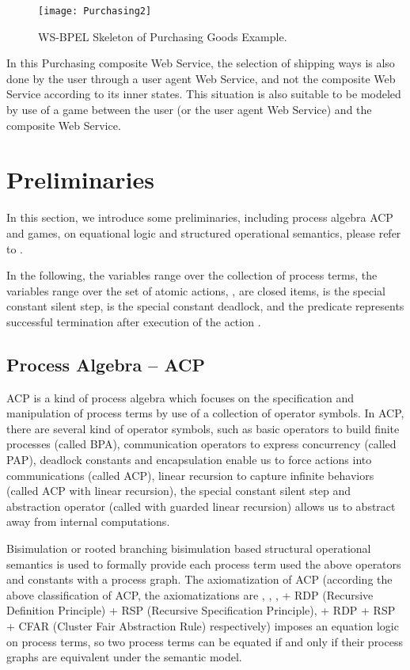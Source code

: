 \documentclass{fac}
\begin{document}
\begin{figure}
  \centering
\texttt{[image: Purchasing2]}
  \caption{WS-BPEL Skeleton of Purchasing Goods Example.}
  \label{Purchasing2}
\end{figure}

In this Purchasing composite Web Service, the selection of shipping ways is also done by the user through a user agent Web Service, and not the composite Web Service according to its inner states. This situation is also suitable to be modeled by use of a game between the user (or the user agent Web Service) and the composite Web Service.

\section{Preliminaries}

In this section, we introduce some preliminaries, including process algebra ACP and games, on equational logic and structured operational semantics, please refer to \cite{ACP}.

In the following, the variables  range over the collection of process terms, the variables  range over the set  of atomic actions, ,  are closed items,  is the special constant silent step,  is the special constant deadlock, and the predicate  represents successful termination after execution of the action .



\subsection{Process Algebra -- ACP}\label{ACPP}

ACP\cite{ACP} is a kind of process algebra which focuses on the specification and manipulation of process terms by use of a collection of operator symbols. In ACP, there are several kind of operator symbols, such as basic operators to build finite processes (called BPA), communication operators to express concurrency (called PAP), deadlock constants and encapsulation enable us to force actions into communications (called ACP), linear recursion to capture infinite behaviors (called ACP with linear recursion), the special constant silent step and abstraction operator (called  with guarded linear recursion) allows us to abstract away from internal computations.

Bisimulation or rooted branching bisimulation based structural operational semantics is used to formally provide each process term used the above operators and constants with a process graph. The axiomatization of ACP (according the above classification of ACP, the axiomatizations are , , ,  + RDP (Recursive Definition Principle) + RSP (Recursive Specification Principle),  + RDP + RSP + CFAR (Cluster Fair Abstraction Rule) respectively) imposes an equation logic on process terms, so two process terms can be equated if and only if their process graphs are equivalent under the semantic model.
\end{document}
